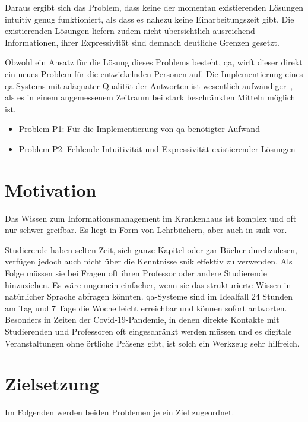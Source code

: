 Daraus ergibt sich das Problem, dass keine der momentan existierenden Lösungen intuitiv genug funktioniert, als dass es nahezu keine Einarbeitungszeit gibt.
Die existierenden Lösungen liefern zudem nicht übersichtlich ausreichend Informationen, ihrer Expressivität sind demnach deutliche Grenzen gesetzt.

Obwohl ein Ansatz für die Lösung dieses Problems besteht, \acl*{qa}, wirft dieser direkt ein neues Problem für die entwickelnden Personen auf.
Die Implementierung eines \acl*{qa}-Systems mit adäquater Qualität der Antworten ist wesentlich aufwändiger~\citep[S.~3]{qanswer}, als es in einem angemessenem Zeitraum bei stark beschränkten Mitteln möglich ist.

\begin{itemize}
	\item Problem P1: Für die Implementierung von \acl{qa} benötigter Aufwand
	\item Problem P2: Fehlende Intuitivität und Expressivität existierender Lösungen
\end{itemize}

\section{Motivation}

Das Wissen zum Informationsmanagement im Krankenhaus ist komplex und oft nur schwer greifbar.
Es liegt in Form von Lehrbüchern, aber auch in \acs{snik} vor.

Studierende haben selten Zeit, sich ganze Kapitel oder gar Bücher durchzulesen, verfügen jedoch auch nicht über die Kenntnisse \acs*{snik} effektiv zu verwenden.
Als Folge müssen sie bei Fragen oft ihren Professor oder andere Studierende hinzuziehen.
Es wäre ungemein einfacher, wenn sie das strukturierte Wissen in natürlicher Sprache abfragen könnten.
\acl*{qa}-Systeme sind im Idealfall 24 Stunden am Tag und 7 Tage die Woche leicht erreichbar und können sofort antworten. 
Besonders in Zeiten der Covid-19-Pandemie, in denen direkte Kontakte mit Studierenden und Professoren oft eingeschränkt werden müssen und es digitale Veranstaltungen ohne örtliche Präsenz gibt, ist solch ein Werkzeug sehr hilfreich.

\section{Zielsetzung}\label{sec:zielsetzung}

Im Folgenden werden beiden Problemen je ein Ziel zugeordnet.

